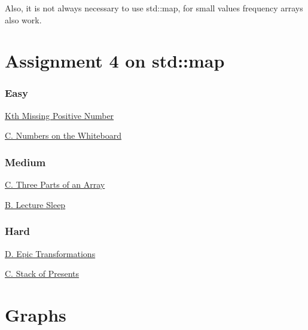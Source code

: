 \documentclass[13pt,oneside,a4paper]{book}
\begin{document}
Also, it is not always necessary to use std::map, for small values frequency arrays also work.

\chapter{Assignment 4 on std::map}

\subsection{Easy}

\href{https://leetcode.com/problems/kth-missing-positive-number/}{Kth Missing Positive Number}

\smallskip

\href{https://codeforces.com/problemset/problem/1430/C}{C. Numbers on the Whiteboard}

\subsection{Medium}

\href{https://codeforces.com/problemset/problem/1006/C}{C. Three Parts of an Array}

\smallskip

\href{https://codeforces.com/problemset/problem/961/B}{B. Lecture Sleep}

\subsection{Hard}

\href{https://codeforces.com/contest/1506/problem/D}{D. Epic Transformations}

\smallskip

\href{https://codeforces.com/problemset/problem/1279/C}{C. Stack of Presents}

\chapter{Graphs}
\end{document}
